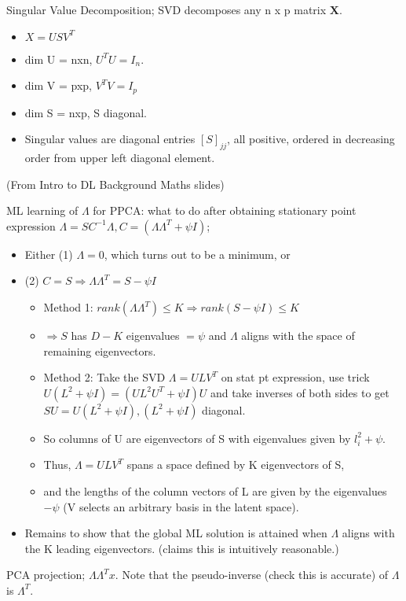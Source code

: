 \documentclass{article}
\begin{document}
Singular Value Decomposition; SVD decomposes any n x p matrix $\mathbf{X}$.\begin{itemize} \item $X = USV^T$ \item dim U = nxn, $U^TU=I_n$.  \item dim V = pxp, $V^TV=I_p$ \item dim S = nxp, S diagonal.  \item Singular values are diagonal entries $[S]_{jj}$, all positive, ordered in decreasing order from upper left diagonal element.  \end{itemize} (From Intro to DL Background Maths slides)

ML learning of $\Lambda$ for PPCA: what to do after obtaining stationary point expression $\Lambda = SC^{-1}\Lambda, C=(\Lambda\Lambda^T+\psi I)$; \begin{itemize} \item Either (1) $\Lambda=0$, which turns out to be a minimum, or \item (2) $C=S \Rightarrow \Lambda\Lambda^T=S-\psi I$ \begin{itemize} \item Method 1: $rank(\Lambda\Lambda^T)\leq K\Rightarrow rank(S-\psi I) \leq K$ \item $\Rightarrow S$ has $D-K$ eigenvalues $=\psi$ and $\Lambda$ aligns with the space of remaining eigenvectors.  \item Method 2: Take the SVD $\Lambda = ULV^T$ on stat pt expression, use trick $U(L^2+\psi I)=(UL^2U^T+\psi I)U$ and take inverses of both sides to get $SU=U(L^2+\psi I), (L^2+\psi I)$ diagonal.  \item So columns of U are eigenvectors of S with eigenvalues given by $l^2_i + \psi$.  \item Thus, $\Lambda = ULV^T$ spans a space defined by K eigenvectors of S, \item and the lengths of the column vectors of L are given by the eigenvalues $-\psi$ (V selects an arbitrary basis in the latent space).  \end{itemize} \item Remains to show that the global ML solution is attained when $\Lambda$ aligns with the K leading eigenvectors. (claims this is intuitively reasonable.) \end{itemize}

PCA projection; $\Lambda\Lambda^Tx$. Note that the pseudo-inverse (check this is accurate) of $\Lambda$ is $\Lambda^T$.
\end{document}
